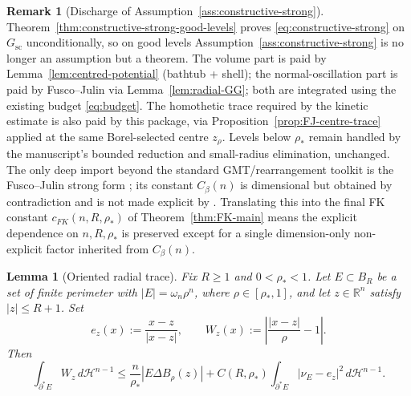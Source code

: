 \documentclass[11pt]{amsart}
\newtheorem{lemma}[theorem]{Lemma}
\theoremstyle{definition}
\newtheorem{remark}[theorem]{Remark}
\newcommand{\R}{\mathbb R}
\newcommand{\rstar}{\rho_*}
\newcommand{\Hn}{\mathcal H^{n-1}}
\begin{document}
\begin{remark}[Discharge of Assumption~\ref{ass:constructive-strong}]
\label{rem:assumption-discharged}
Theorem~\ref{thm:constructive-strong-good-levels} proves
\eqref{eq:constructive-strong} on \(G_{\mathrm{sc}}\) unconditionally, so on
good levels Assumption~\ref{ass:constructive-strong} is no longer an
assumption but a theorem.  The volume part is paid by
Lemma~\ref{lem:centred-potential} (bathtub + shell); the normal-oscillation
part is paid by Fusco--Julin \cite{FJ2014} via
Lemma~\ref{lem:radial-GG}; both are integrated using the existing budget
\eqref{eq:budget}.  The homothetic trace required by the kinetic estimate is
also paid by this package, via Proposition~\ref{prop:FJ-centre-trace} applied
at the same Borel-selected centre \(z_\rho\).  Levels below \(\rstar\) remain
handled by the manuscript's bounded reduction and small-radius elimination,
unchanged.  The only deep import beyond the standard GMT/rearrangement
toolkit is the Fusco--Julin strong form \cite{FJ2014}; its constant
\(C_\beta(n)\) is dimensional but obtained by contradiction and is not made
explicit by \cite{FJ2014}.  Translating this into the final FK constant
\(c_{FK}(n,R,\rstar)\) of Theorem~\ref{thm:FK-main} means the explicit
dependence on \(n,R,\rstar\) is preserved except for a single dimension-only
non-explicit factor inherited from \(C_\beta(n)\).
\end{remark}

\begin{lemma}[Oriented radial trace]\label{lem:oriented-radial-trace}
Fix \(R\ge1\) and \(0<\rstar<1\).  Let \(E\subset B_R\) be a set of finite
perimeter with \(|E|=\omega_n\rho^n\), where \(\rho\in[\rstar,1]\), and
let \(z\in\R^n\) satisfy \(|z|\le R+1\).  Set
\[
   e_z(x):=\frac{x-z}{|x-z|},\qquad
   W_z(x):=\left|\frac{|x-z|}{\rho}-1\right|.
\]
Then
\begin{equation}\label{eq:oriented-radial-trace}
   \int_{\partial^*E} W_z\,d\Hn
   \le
   \frac{n}{\rstar}|E\Delta B_\rho(z)|
   +
   C(R,\rstar)
   \int_{\partial^*E}|\nu_E-e_z|^2\,d\Hn .
\end{equation}
\end{lemma}
\end{document}
